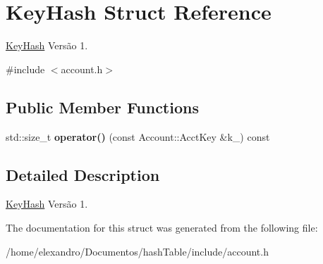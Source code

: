 \hypertarget{struct_key_hash}{}\section{Key\+Hash Struct Reference}
\label{struct_key_hash}


\hyperlink{struct_key_hash}{Key\+Hash} Versão 1.  




{\ttfamily \#include $<$account.\+h$>$}

\subsection*{Public Member Functions}
\begin{DoxyCompactItemize}
\item 
\mbox{\label{struct_key_hash_a8f1951aee1f0901aaaab0cc3c1af547f}} 
std\+::size\+\_\+t {\bfseries operator()} (const Account\+::\+Acct\+Key \&k\+\_\+) const
\end{DoxyCompactItemize}


\subsection{Detailed Description}
\hyperlink{struct_key_hash}{Key\+Hash} Versão 1. 

The documentation for this struct was generated from the following file\+:\begin{DoxyCompactItemize}
\item 
/home/elexandro/\+Documentos/hash\+Table/include/account.\+h\end{DoxyCompactItemize}
